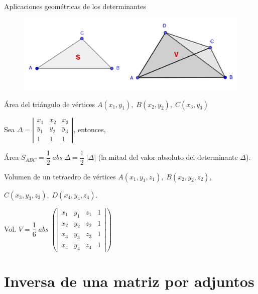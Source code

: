 \vspace{10mm}
\begin{myexampleblock}{Aplicaciones geométricas de los determinantes}

\begin{figure}[H]
	\centering
	\includegraphics[width=1\textwidth]{imagenes/imagenes04/T04IM04.png}
\end{figure}

Área del triángulo de vértices $A(x_1,y_1),\; B(x_2,y_2),\; C(x_3,y_3)$

Sea $\Delta = \left| \begin{matrix} x_1&x_2&x_3 \\ y_1&y_2&y_3\\1&1&1 \end{matrix} \right|$, entonces, 

Área $S_{ABC}= \dfrac 1 2 \; abs \; \Delta = \dfrac 1 2 \;|\Delta|$ (la mitad del valor absoluto del determinante $\Delta$).

Volumen de un tetraedro de vértices  $A(x_1,y_1,z_1),\; B(x_2,y_2,z_2),$

\noindent $C(x_3,y_3,z_3), \; D(x_4,y_4,z_4)$.

\centerline{Vol. $V=\dfrac 1 6\; abs\; \left( \left| \begin{matrix} x_1&y_1&z_1&1 \\   x_2&y_2&z_2&1  \\  x_3&y_3&z_3&1  \\  x_4&y_4&z_4&1  \end{matrix} \right| \right)$}

\end{myexampleblock}



\justify




\section{Inversa de una matriz por adjuntos}

